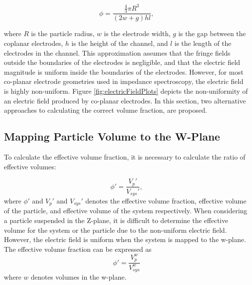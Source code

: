 \begin{equation}
    \phi = \frac{\frac{4}{3}\pi R^3}{(2w+g)hl},
\end{equation}

\noindent where $R$ is the particle radius, $w$ is the electrode width, $g$ is the gap between the coplanar electrodes, $h$ is the height of the channel, and $l$ is the length of the electrodes in the channel. This approximation assumes that the fringe fields outside the boundaries of the electrodes is negligible, and that the electric field magnitude is uniform inside the boundaries of the electrodes. However, for most co-planar electrode geometries used in impedance spectroscopy, the electric field is highly non-uniform. Figure \ref{fig:electricFieldPlots} depicts the non-uniformity of an electric field produced by co-planar electrodes. In this section, two alternative approaches to calculating the correct volume fraction, are proposed. 

\subsection*{Mapping Particle Volume to the W-Plane}
\par To calculate the effective volume fraction, it is necessary to calculate the ratio of effective volumes:

\begin{equation}
    \phi ' = \frac{V_p'}{V_{sys}'},
\end{equation}
\noindent where $\phi '$ and $V_p '$ and $V_{sys}'$ denotes the effective volume fraction, effective volume of the particle, and effective volume of the system respectively. When considering a particle suspended in the Z-plane, it is difficult to determine the effective volume for the system or the particle due to the non-uniform electric field. However, the electric field is uniform when the system is mapped to the w-plane. The effective volume fraction can be expressed as
\begin{equation}
    \phi ' = \frac{V^w_p}{V^w_{sys}}
\end{equation}
\noindent where $w$ denotes volumes in the w-plane.

